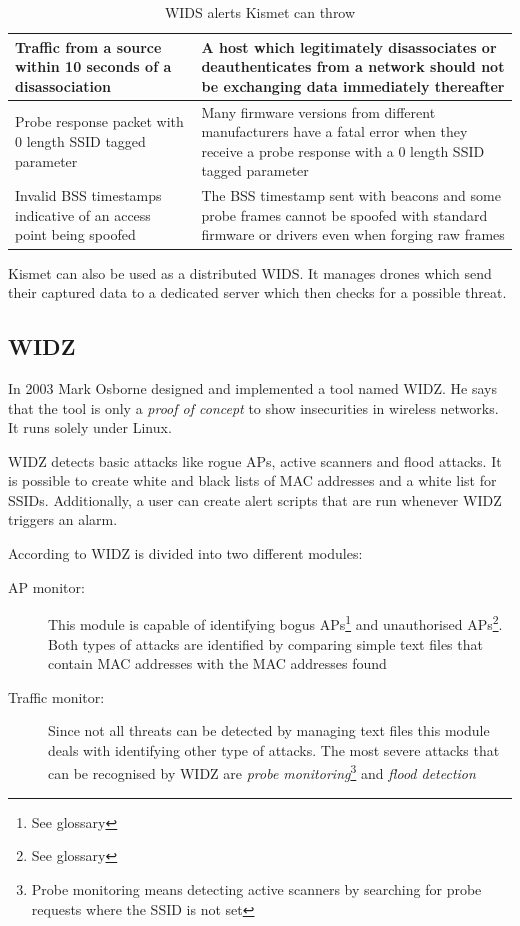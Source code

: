 \begin{table}[htbp]
\begin{center}
\begin{tabular}{|p{150pt}|p{200pt}|}
		\hline
		Traffic from a source within 10 seconds of a disassociation&A host which legitimately disassociates or deauthenticates from a network should not be 
exchanging data immediately thereafter\\
		\hline
		Probe response packet with 0 length SSID tagged parameter&Many firmware versions from different manufacturers have a fatal error when they receive a probe response with a 0 length SSID tagged parameter\\
		\hline
		Invalid BSS timestamps indicative of an access point being spoofed&The BSS timestamp sent with beacons and some probe frames cannot be spoofed with standard firmware or drivers even when forging raw frames\\
		\hline
		\end{tabular}
	\end{center}
	\caption{WIDS alerts Kismet can throw}
	\label{kismetalerts}
\end{table}

Kismet can also be used as a distributed WIDS. It manages drones which send their captured data to a dedicated server which then checks for a possible threat.

\subsection*{WIDZ}

In 2003 Mark Osborne designed and implemented a tool named WIDZ. He says that the tool is only a {\em proof of concept} to show insecurities in wireless networks. \cite{widz_design} It runs solely under Linux.

WIDZ detects basic attacks like rogue APs, active scanners and flood attacks. It is possible to create white and black lists of MAC addresses and a white list for SSIDs. Additionally, a user can create alert scripts that are run whenever WIDZ triggers an alarm.

According to \cite[p.3f]{widz_design} WIDZ is divided into two different modules:

\begin{description}
    \item[AP monitor:] This module is capable of identifying bogus APs\footnote{See glossary} and unauthorised APs\footnote{See glossary}. Both types of attacks are identified by comparing simple text files that contain MAC addresses with the MAC addresses found
\pagebreak
	\item[Traffic monitor:] Since not all threats can be detected by managing text files this module deals with identifying other type of attacks. The most severe attacks that can be recognised by WIDZ are {\em probe monitoring}\footnote{Probe monitoring means detecting active scanners by searching for probe requests where the SSID is not set} and {\em flood detection}

\end{description}

